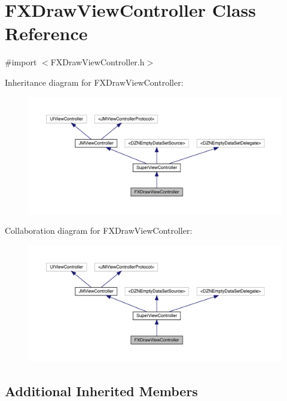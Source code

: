 \hypertarget{interface_f_x_draw_view_controller}{}\section{F\+X\+Draw\+View\+Controller Class Reference}
\label{interface_f_x_draw_view_controller}


{\ttfamily \#import $<$F\+X\+Draw\+View\+Controller.\+h$>$}



Inheritance diagram for F\+X\+Draw\+View\+Controller\+:\nopagebreak
\begin{figure}[H]
\begin{center}
\leavevmode
\includegraphics[width=350pt]{interface_f_x_draw_view_controller__inherit__graph}
\end{center}
\end{figure}


Collaboration diagram for F\+X\+Draw\+View\+Controller\+:\nopagebreak
\begin{figure}[H]
\begin{center}
\leavevmode
\includegraphics[width=350pt]{interface_f_x_draw_view_controller__coll__graph}
\end{center}
\end{figure}
\subsection*{Additional Inherited Members}



